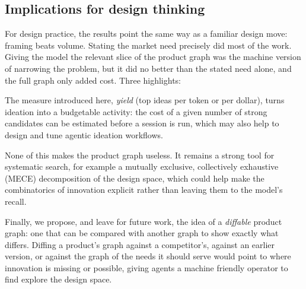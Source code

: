 \hypertarget{implications-for-design-thinking}{%
\subsection{Implications for design thinking}\label{implications-for-design-thinking}}
For design practice, the results point the same way as a familiar design move: framing beats volume. Stating the market need precisely did most of the work. Giving the model the relevant slice of the product graph was the machine version of narrowing the problem, but it did no better than the stated need alone, and the full graph only added cost. Three highlights:

The measure introduced here, \emph{yield} (top ideas per token or per dollar), turns ideation into a budgetable activity: the cost of a given number of strong candidates can be estimated before a session is run, which may also help to design and tune agentic ideation workflows.

None of this makes the product graph useless. It remains a strong tool for systematic search, for example a mutually exclusive, collectively exhaustive (MECE) decomposition of the design space, which could help make the combinatorics of innovation explicit rather than leaving them to the model's recall.

Finally, we propose, and leave for future work, the idea of a \emph{diffable} product graph: one that can be compared with another graph to show exactly what differs. Diffing a product's graph against a competitor's, against an earlier version, or against the graph of the needs it should serve would point to where innovation is missing or possible, giving agents a machine friendly operator to find explore the design space.

